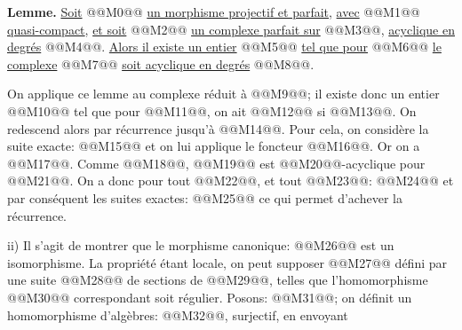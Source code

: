
\textbf{Lemme.} \uline{Soit} @@M0@@ \uline{un morphisme projectif et parfait}, \uline{avec} @@M1@@ \uline{quasi-compact}, \uline{et soit} @@M2@@ \uline{un complexe parfait sur} @@M3@@, \uline{acyclique en degrés} @@M4@@. \uline{Alors il existe un entier} @@M5@@ \uline{tel que pour} @@M6@@ \uline{le complexe} @@M7@@ \uline{soit acyclique en degrés} @@M8@@.

On applique ce lemme au complexe réduit à @@M9@@; il existe donc un entier @@M10@@ tel que pour @@M11@@, on ait @@M12@@ si @@M13@@. On redescend alors par récurrence jusqu'à @@M14@@. Pour cela, on considère la suite exacte:
@@M15@@
et on lui applique le foncteur @@M16@@. Or on a @@M17@@. Comme @@M18@@, @@M19@@ est @@M20@@-acyclique pour @@M21@@. On a donc pour tout @@M22@@, et tout @@M23@@:
@@M24@@
et par conséquent les suites exactes:
@@M25@@
ce qui permet d'achever la récurrence.

ii) Il s'agit de montrer que le morphisme canonique:
@@M26@@
est un isomorphisme. La propriété étant locale, on peut supposer @@M27@@ défini par une suite @@M28@@ de sections de @@M29@@, telles que l'homomorphisme @@M30@@ correspondant soit régulier. Posons: @@M31@@; on définit un homomorphisme d'algèbres: @@M32@@, surjectif, en envoyant 
